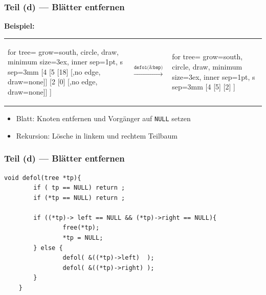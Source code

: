 \documentclass{beamer}
\begin{document}
\begin{frame} \frametitle{Teil (d) --- Blätter entfernen}
	\textbf{Beispiel:}
	\begin{center}
		\begin{tabularx}{\linewidth}{m{3cm} m{1.5cm} m{2cm}}
			\begin{forest}
				for tree={ grow=south, circle, draw, minimum size=3ex, inner sep=1pt, s sep=3mm }
				[4 	[5 [18] [,no edge, draw=none]] [2 [0] [,no edge, draw=none]] ]
			\end{forest}
			&
			$\overset{\texttt{defol(\&bsp)}}{\longrightarrow}$
			&
			\begin{forest}
				for tree={ grow=south, circle, draw, minimum size=3ex, inner sep=1pt, s sep=3mm }
				[4 	[5] [2] ]
			\end{forest}
		\end{tabularx}
	\end{center}
	\pause
	\begin{itemize}
		\item Blatt: Knoten entfernen und Vorgänger auf \texttt{NULL} setzen
		\item Rekursion: Lösche in linkem und rechtem Teilbaum
	\end{itemize}
\end{frame}
\begin{frame}[fragile] \frametitle{Teil (d) --- Blätter entfernen}
	
	\begin{lstlisting}[style=notebook]
	void defol(tree *tp){
		if ( tp == NULL) return ;
		if (*tp == NULL) return ;
		
		if ((*tp)-> left == NULL && (*tp)->right == NULL){
				free(*tp);
				*tp = NULL;
		} else {
				defol( &((*tp)->left)  );
				defol( &((*tp)->right) );
		}
	}
	\end{lstlisting}
\end{frame}
\end{document}

